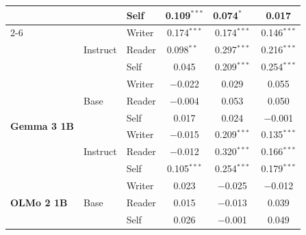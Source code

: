 \begin{table}[htbp]
\begin{tabular}{lll ccc}
                                 &                          & Self       & 0.109$^{***}$            & 0.074$^{*}\phantom{^{**}}$ & 0.017\phantom{$^{***}$}  \\
\cmidrule(lr){2-6}
                                 & \multirow{3}{*}{Instruct} & Writer     & 0.174$^{***}$            & 0.174$^{***}$            & 0.146$^{***}$            \\
                                 &                          & Reader     & 0.098$^{**}\phantom{^{*}}$ & 0.297$^{***}$            & 0.216$^{***}$            \\
                                 &                          & Self       & 0.045\phantom{$^{***}$}  & 0.209$^{***}$            & 0.254$^{***}$            \\
\midrule
\multirow{6}{*}{\textbf{Gemma 3 1B}} & \multirow{3}{*}{Base}    & Writer     & $-$0.022\phantom{$^{***}$} & 0.029\phantom{$^{***}$}  & 0.055\phantom{$^{***}$}  \\
                                 &                          & Reader     & $-$0.004\phantom{$^{***}$} & 0.053\phantom{$^{***}$}  & 0.050\phantom{$^{***}$}  \\
                                 &                          & Self       & 0.017\phantom{$^{***}$}  & 0.024\phantom{$^{***}$}  & $-$0.001\phantom{$^{***}$} \\
\cmidrule(lr){2-6}
                                 & \multirow{3}{*}{Instruct} & Writer     & $-$0.015\phantom{$^{***}$} & 0.209$^{***}$            & 0.135$^{***}$            \\
                                 &                          & Reader     & $-$0.012\phantom{$^{***}$} & 0.320$^{***}$            & 0.166$^{***}$            \\
                                 &                          & Self       & 0.105$^{***}$            & 0.254$^{***}$            & 0.179$^{***}$            \\
\midrule
\multirow{6}{*}{\textbf{OLMo 2 1B}} & \multirow{3}{*}{Base}    & Writer     & 0.023\phantom{$^{***}$}  & $-$0.025\phantom{$^{***}$} & $-$0.012\phantom{$^{***}$} \\
                                 &                          & Reader     & 0.015\phantom{$^{***}$}  & $-$0.013\phantom{$^{***}$} & 0.039\phantom{$^{***}$}  \\
                                 &                          & Self       & 0.026\phantom{$^{***}$}  & $-$0.001\phantom{$^{***}$} & 0.049\phantom{$^{***}$}  \\

\end{tabular}
\end{table}
